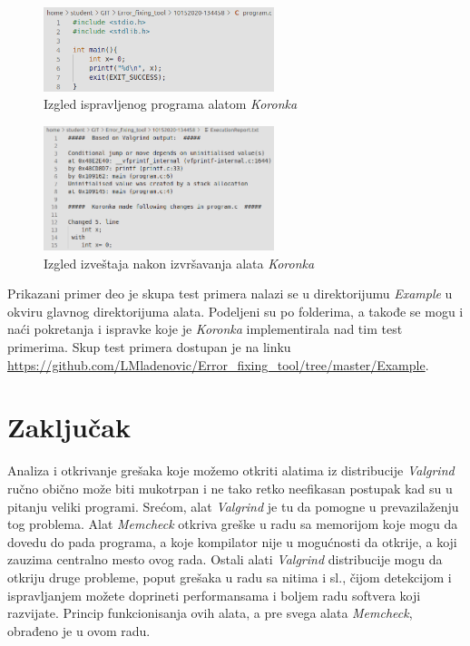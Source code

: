 \documentclass[12pt,oneside]{memoir}
\theoremstyle{plain}
\theoremstyle{definition}
\begin{document}
\begin{figure}[!ht]
  \centering
  \includegraphics[width=0.6\textwidth]{FixedProgram.png}
  \caption{Izgled ispravljenog programa alatom \textit{Koronka}}
  \label{fig:slika4.12}
\end{figure}

\begin{figure}[!ht]
  \centering
  \includegraphics[width=0.6\textwidth]{ExecutionReport.png}
  \caption{Izgled izveštaja nakon izvršavanja alata \textit{Koronka}}
  \label{fig:slika4.13}
\end{figure}

Prikazani primer deo je skupa test primera nalazi se u direktorijumu \textit{Example} u okviru glavnog direktorijuma alata. Podeljeni su po folderima, a takođe se mogu i naći pokretanja i ispravke koje je \textit{Koronka} implementirala nad tim test primerima. Skup test primera dostupan je na linku \url{https://github.com/LMladenovic/Error_fixing_tool/tree/master/Example}. 


\chapter{Zaključak}
Analiza i otkrivanje grešaka koje možemo otkriti alatima iz distribucije \textit{Valgrind} ručno obično može biti mukotrpan i ne tako retko neefikasan postupak kad su u pitanju veliki programi. Srećom, alat \textit{Valgrind} je tu da pomogne u prevazilaženju tog problema. Alat \textit{Memcheck} otkriva greške u radu sa memorijom koje mogu da dovedu do pada programa, a koje kompilator nije u mogućnosti da otkrije, a koji zauzima centralno mesto ovog rada. Ostali alati \textit{Valgrind} distribucije mogu da otkriju druge probleme, poput grešaka u radu sa nitima i sl., čijom detekcijom i ispravljanjem možete doprineti performansama i boljem radu softvera koji razvijate. Princip funkcionisanja ovih alata, a pre svega alata \textit{Memcheck}, obrađeno je u ovom radu. 
\end{document}
